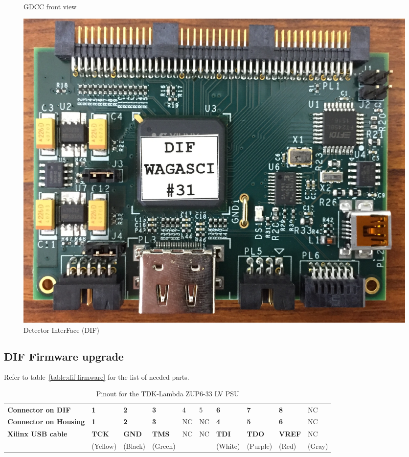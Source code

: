 \begin{figure}[H]
\begin{minipage}{0.2\linewidth}
    \caption{GDCC front view}\label{fig:GDCC-front-view}
  \end{minipage}%
  \begin{minipage}{0.7\linewidth}
    \centering \includegraphics[width=0.9\linewidth, frame]{DIF}
    \caption{Detector InterFace (DIF)}
  \end{minipage}
\end{figure}

\subsection{DIF Firmware upgrade}
Refer to table~\ref{table:dif-firmware} for the list of needed parts.
\begin{table}[H]
  \centering
  \begin{tabular}{|l|l l l l l l l l l|}
    \hline
    \textbf{Connector on DIF} & \textbf{1} & \textbf{2} & \textbf{3} %
    & 4 & 5 & \textbf{6} & \textbf{7} & \textbf{8} & NC \\
    \textbf{Connector on Housing} & \textbf{1} & \textbf{2} & \textbf{3} %
    & NC & NC & \textbf{4} & \textbf{5} & \textbf{6} & NC\\
    \textbf{Xilinx USB cable} & \textbf{TCK} & \textbf{GND} & \textbf{TMS} %
    & NC & NC & \textbf{TDI} & \textbf{TDO} & \textbf{VREF} & NC \\
    & (Yellow) & (Black) & (Green) & & & (White) & (Purple) & (Red) & (Gray) \\
    \hline
  \end{tabular}
  \caption{Pinout for the TDK-Lambda ZUP6-33 LV PSU}
\end{table}

